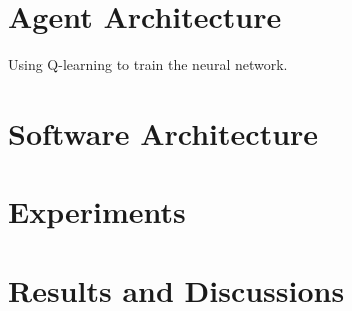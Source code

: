 \documentclass[conference,compsoc]{IEEEtran}
\begin{document}
\section{Agent Architecture}
Using Q-learning to train the neural network. 

\section{Software Architecture}

\section{Experiments}

\section{Results and Discussions}

%
%

\end{document}
